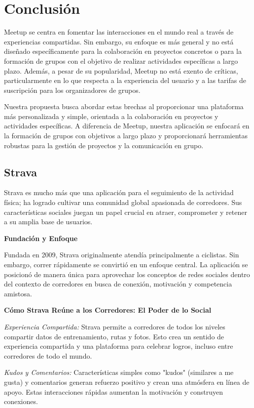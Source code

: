 \section{Conclusión}

Meetup se centra en fomentar las interacciones en el mundo real a 
través de experiencias compartidas. Sin embargo, su enfoque es más 
general y no está diseñado específicamente para la colaboración en 
proyectos concretos o para la formación de grupos con el objetivo de 
realizar actividades específicas a largo plazo. Además, a pesar de su 
popularidad, Meetup no está exento de críticas, particularmente en lo 
que respecta a la experiencia del usuario y a las tarifas de suscripción 
para los organizadores de grupos.

Nuestra propuesta busca abordar estas brechas al proporcionar una 
plataforma más personalizada y simple, orientada a la colaboración en proyectos y 
actividades específicas. A diferencia de Meetup, nuestra aplicación se 
enfocará en la formación de grupos con objetivos a largo plazo y proporcionará 
herramientas robustas para la gestión de proyectos y la comunicación en grupo.
\subsection{Strava}

Strava es mucho más que una aplicación para el seguimiento de la actividad física; ha logrado cultivar una comunidad global apasionada de corredores. Sus características sociales juegan un papel crucial en atraer, comprometer y retener a su amplia base de usuarios.

\textbf{Fundación y Enfoque}

Fundada en 2009, Strava originalmente atendía principalmente a ciclistas. Sin embargo, correr rápidamente se convirtió en un enfoque central. La aplicación se posicionó de manera única para aprovechar los conceptos de redes sociales dentro del contexto de corredores en busca de conexión, motivación y competencia amistosa.

\textbf{Cómo Strava Reúne a los Corredores: El Poder de lo Social}

\textit{Experiencia Compartida:} Strava permite a corredores de todos los niveles compartir datos de entrenamiento, rutas y fotos. Esto crea un sentido de experiencia compartida y una plataforma para celebrar logros, incluso entre corredores de todo el mundo.

\textit{Kudos y Comentarios:} Características simples como "kudos" (similares a me gusta) y comentarios generan refuerzo positivo y crean una atmósfera en línea de apoyo. Estas interacciones rápidas aumentan la motivación y construyen conexiones.

